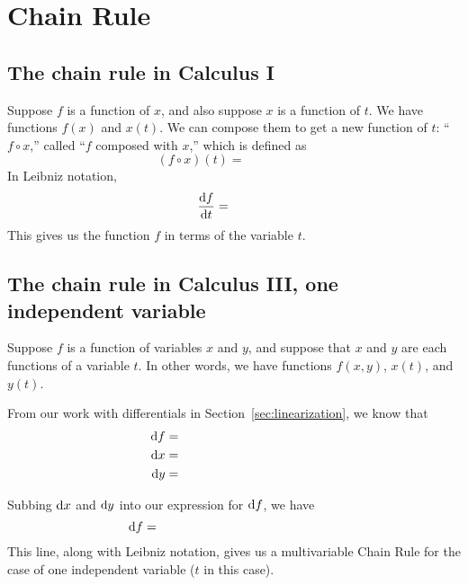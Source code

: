 \newlecture

\setcounter{section}{4}
\def\coursetopicnumber{II}
\def\topic{Chain Rule} %
\def\shorttopic{Chain rule} %
\def\textbookname{Active Calculus} %
\def\shorttextbookname{AC} %
\def\textbooksection{10.5} %
\def\textbooksectionurl{https://activecalculus.org/vector/S-10-5-Chain-Rule.html} %
\def\handoutday{} %


\thispagestyle{plain}
\topstuff
\section{\topic{} \booklink{}}
\label{sec:chain-rule}
\subsection{The chain rule in Calculus I}
Suppose $f$ is a function of $x$, and also suppose $x$ is a function of $t$. We have functions $f(x)$ and $x(t)$. We can compose them to get a new function of $t$: ``$f\circ x$,'' called ``$f$ composed with $x$,'' which is defined as 
\[
    (f\circ x) (t) = \phantom{f(x(t)).}
\] 
In Leibniz notation,
\[
    \dfd{f}{t}=\phantom{\dfd{f}{x}\dfd{x}{t}.}
\]
This gives us the function $f$ in terms of the variable $t$. 

\subsection{The chain rule in Calculus III, one independent variable}
Suppose $f$ is a function of variables $x$ and $y$, and suppose that $x$ and $y$ are each functions of a variable $t$. In other words, we have functions $f(x,y)$, $x(t)$, and $y(t)$.

From our work with differentials in Section~\ref{sec:linearization}, we know that 
\begin{align*}
    \dif f&=\phantom{f_x(x,y)\dx+f_y(x,y)\dy,}\\
    \dx&=\phantom{x'(t)\dt,}\\
    \dy&=\phantom{y'(t)\dt.}
\end{align*}

Subbing $\mathop{}\!\mathrm{d} x$ and $\mathop{}\!\mathrm{d} y$ into our expression for $\mathop{}\!\mathrm{d} f$, we have
\[
    \dif f=\phantom{f_x(x,y)x'(t)\dt+f_y(x,y)y'(t)\dt.}
\]
This line, along with Leibniz notation, gives us a multivariable Chain Rule for the case of one independent variable ($t$ in this case).

